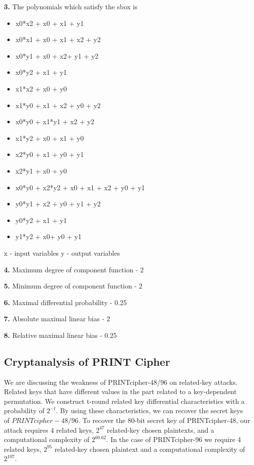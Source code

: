 \documentclass[journal=tosc,preprint]{iacrtrans}
\begin{document}
\noindent\textbf{3. } The polynomials which satisfy the sbox is
\begin{itemize}
	\item x0*x2 + x0 + x1 + y1
	\item x0*x1 + x0 + x1 + x2 + y2
	\item x0*y1 + x0 + x2+ y1 + y2
	\item x0*y2 + x1 + y1
	\item x1*x2 + x0 + y0
	\item x1*y0 + x1 + x2 + y0 + y2
	\item x0*y0 + x1*y1 + x2 + y2
	\item x1*y2 + x0 + x1 + y0
	\item x2*y0 + x1 + y0 + y1
	\item x2*y1 + x0 + y0
	\item x0*y0 + x2*y2 + x0 + x1 + x2 + y0 + y1
	\item y0*y1 + x2 + y0 + y1 + y2
	\item y0*y2 + x1 + y1
	\item y1*y2 + x0+ y0 + y1
\end{itemize}
\hspace{0.5cm} x - input variables y - output variables \newline

\noindent\textbf{4.} Maximum degree of component function - 2\newline

\noindent\textbf{5.} Minimum degree of component function - 2\newline

\noindent\textbf{6.} Maximal differential probability - 0.25\newline

\noindent\textbf{7.} Absolute maximal linear bias - 2\newline

\noindent\textbf{8.} Relative maximal linear bias - 0.25\newline

\subsection{Cryptanalysis of PRINT Cipher}
We are discussing the weakness of PRINTcipher-48/96 on related-key attacks. Related keys that have different values in the part related to a key-dependent permutation. We construct t-round related key differential characteristics with a probability of \(2^{-t}\). By using these characteristics, we can recover the secret keys of \(PRINTcipher-48/96\). To recover the 80-bit secret key of PRINTcipher-48, our attack requires 4 related keys, \(2^{47}\) related-key chosen plaintexts, and a computational complexity of \(2^{60.62}\). In the case of PRINTcipher-96 we require 4 related keys, \(2^{95}\) related-key chosen plaintext and a computational complexity of \(2^{107}\).
\end{document}
